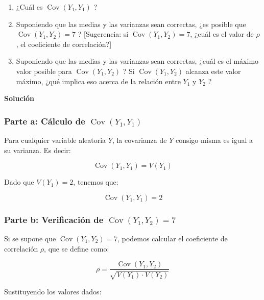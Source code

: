 \documentclass[
]{article}
\providecommand{\tightlist}{%
  \setlength{\itemsep}{0pt}\setlength{\parskip}{0pt}}
\begin{document}
\begin{enumerate}
\def\labelenumi{\arabic{enumi}.}
\tightlist
\item
  ¿Cuál es \(\operatorname{Cov}\left(Y_{1}, Y_{1}\right)\) ?
\item
  Suponiendo que las medias y las varianzas sean correctas, ¿es posible que \(\operatorname{Cov}\left(Y_{1}, Y_{2}\right)=7\) ? {[}Sugerencia: si \(\operatorname{Cov}\left(Y_{1}, Y_{2}\right)=7\), ¿cuál es el valor de \(\rho\), el coeficiente de correlación?{]}
\item
  Suponiendo que las medias y las varianzas sean correctas, ¿cuál es el máximo valor posible para \(\operatorname{Cov}\left(Y_{1}, Y_{2}\right)\) ? Si \(\operatorname{Cov}\left(Y_{1}, Y_{2}\right)\) alcanza este valor máximo, ¿qué implica eso acerca de la relación entre \(Y_{1}\) y \(Y_{2}\) ?
\end{enumerate}

\textbf{Solución}

\subsubsection{\texorpdfstring{Parte a: Cálculo de \(\operatorname{Cov}(Y_1, Y_1)\)}{Parte a: Cálculo de \textbackslash operatorname\{Cov\}(Y\_1, Y\_1)}}\label{parte-a-cuxe1lculo-de-operatornamecovy_1-y_1}

Para cualquier variable aleatoria \(Y\), la covarianza de \(Y\) consigo misma es igual a su varianza. Es decir:

\[
\operatorname{Cov}(Y_1, Y_1) = V(Y_1)
\]

Dado que \(V(Y_1) = 2\), tenemos que:

\[
\operatorname{Cov}(Y_1, Y_1) = 2
\]

\subsubsection{\texorpdfstring{Parte b: Verificación de \(\operatorname{Cov}(Y_1, Y_2) = 7\)}{Parte b: Verificación de \textbackslash operatorname\{Cov\}(Y\_1, Y\_2) = 7}}\label{parte-b-verificaciuxf3n-de-operatornamecovy_1-y_2-7}

Si se supone que \(\operatorname{Cov}(Y_1, Y_2) = 7\), podemos calcular el coeficiente de correlación \(\rho\), que se define como:

\[
\rho = \frac{\operatorname{Cov}(Y_1, Y_2)}{\sqrt{V(Y_1) \cdot V(Y_2)}}
\]

Sustituyendo los valores dados:
\end{document}
